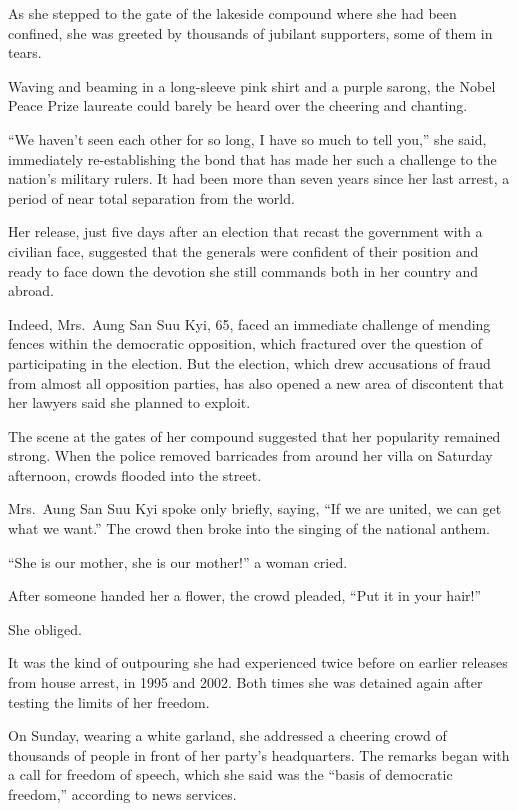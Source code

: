 ﻿\documentclass[12pt]{article}
\begin{document}
As she stepped to the gate of the lakeside compound where she had been confined, she was greeted by
thousands of jubilant supporters, some of them in tears.

Waving and beaming in a long-sleeve pink shirt and a purple sarong, the Nobel Peace Prize laureate
could barely be heard over the cheering and chanting.

``We haven't seen each other for so long, I have so much to tell you,'' she said, immediately
re-establishing the bond that has made her such a challenge to the nation's military rulers. It had
been more than seven years since her last arrest, a period of near total separation from the world.

Her release, just five days after an election that recast the government with a civilian face,
suggested that the generals were confident of their position and ready to face down the devotion she
still commands both in her country and abroad.

Indeed, Mrs.~Aung San Suu Kyi, 65, faced an immediate challenge of mending fences within the
democratic opposition, which fractured over the question of participating in the election. But the
election, which drew accusations of fraud from almost all opposition parties, has also opened a new
area of discontent that her lawyers said she planned to exploit.

The scene at the gates of her compound suggested that her popularity remained strong. When the
police removed barricades from around her villa on Saturday afternoon, crowds flooded into the
street.

Mrs.~Aung San Suu Kyi spoke only briefly, saying, ``If we are united, we can get what we want.'' The
crowd then broke into the singing of the national anthem.

``She is our mother, she is our mother!'' a woman cried.

After someone handed her a flower, the crowd pleaded, ``Put it in your hair!''

She obliged.

It was the kind of outpouring she had experienced twice before on earlier releases from house
arrest, in 1995 and 2002. Both times she was detained again after testing the limits of her freedom.

On Sunday, wearing a white garland, she addressed a cheering crowd of thousands of people in front
of her party's headquarters. The remarks began with a call for freedom of speech, which she said was
the ``basis of democratic freedom,'' according to news services.
\end{document}
